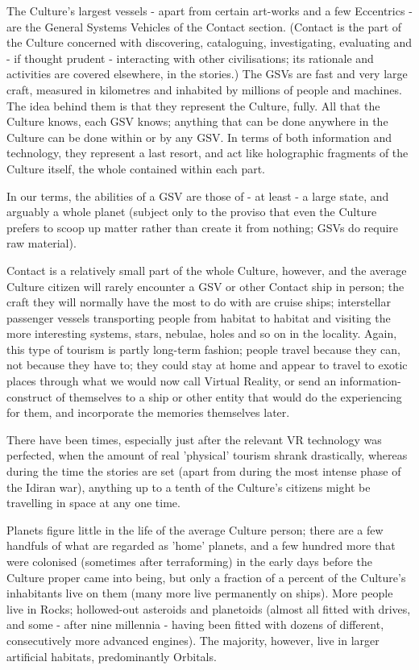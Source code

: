 The Culture's largest vessels - apart from certain art-works and a few Eccentrics - are the General Systems Vehicles of the Contact section. (Contact is the part of the Culture concerned with discovering, cataloguing, investigating, evaluating and - if thought prudent - interacting with other civilisations; its rationale and activities are covered elsewhere, in the stories.) The GSVs are fast and very large craft, measured in kilometres and inhabited by millions of people and machines. The idea behind them is that they represent the Culture, fully. All that the Culture knows, each GSV knows; anything that can be done anywhere in the Culture can be done within or by any GSV. In terms of both information and technology, they represent a last resort, and act like holographic fragments of the Culture itself, the whole contained within each part.

In our terms, the abilities of a GSV are those of - at least - a large state, and arguably a whole planet (subject only to the proviso that even the Culture prefers to scoop up matter rather than create it from nothing; GSVs do require raw material).

Contact is a relatively small part of the whole Culture, however, and the average Culture citizen will rarely encounter a GSV or other Contact ship in person; the craft they will normally have the most to do with are cruise ships; interstellar passenger vessels transporting people from habitat to habitat and visiting the more interesting systems, stars, nebulae, holes and so on in the locality. Again, this type of tourism is partly long-term fashion; people travel because they can, not because they have to; they could stay at home and appear to travel to exotic places through what we would now call Virtual Reality, or send an information-construct of themselves to a ship or other entity that would do the experiencing for them, and incorporate the memories themselves later.

There have been times, especially just after the relevant VR technology was perfected, when the amount of real 'physical' tourism shrank drastically, whereas during the time the stories are set (apart from during the most intense phase of the Idiran war), anything up to a tenth of the Culture's citizens might be travelling in space at any one time.

Planets figure little in the life of the average Culture person; there are a few handfuls of what are regarded as 'home' planets, and a few hundred more that were colonised (sometimes after terraforming) in the early days before the Culture proper came into being, but only a fraction of a percent of the Culture's inhabitants live on them (many more live permanently on ships). More people live in Rocks; hollowed-out asteroids and planetoids (almost all fitted with drives, and some - after nine millennia - having been fitted with dozens of different, consecutively more advanced engines). The majority, however, live in larger artificial habitats, predominantly Orbitals.

